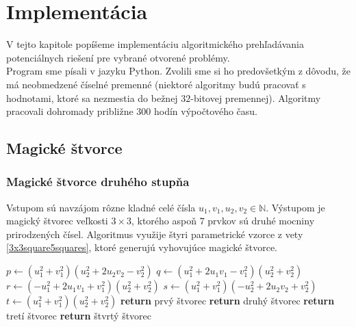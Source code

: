 \chapter{Implementácia}

\label{kap:implementation} %

V tejto kapitole popíšeme implementáciu algoritmického prehľadávania potenciálnych riešení pre vybrané otvorené problémy. \\

Program sme písali v jazyku Python. Zvolili sme si ho predovšetkým z dôvodu, že má neobmedzené číselné premenné (niektoré algoritmy budú pracovať s hodnotami, ktoré sa nezmestia do bežnej $32$-bitovej premennej). Algoritmy pracovali dohromady približne $300$ hodín výpočtového času.

\section{Magické štvorce}

\subsection{Magické štvorce druhého stupňa}

\begin{subalg} Vstupom sú navzájom rôzne kladné celé čísla $u_1, v_1, u_2, v_2 \in \mathbb{N}$. Výstupom je magický štvorec veľkosti $3 \times 3$, ktorého aspoň $7$ prvkov sú druhé mocniny prirodzených čísel. Algoritmus využije štyri parametrické vzorce z vety \ref{3x3square5squares}, ktoré generujú vyhovujúce magické štvorce.
\end{subalg}

\begin{algorithmic}
\State $p \gets (u_1^2 + v_1^2)(u_2^2 + 2u_2 v_2 - v_2^2)$
\State $q \gets (u_1^2 + 2u_1 v_1 - v_1^2)(u_2^2 + v_2^2)$
\State $r \gets (- u_1^2 + 2u_1 v_1 + v_1^2)(u_2^2 + v_2^2)$
\State $s \gets (u_1^2 + v_1^2)(-u_2^2 + 2u_2 v_2 + v_2^2)$
\State $t \gets (u_1^2 + v_1^2)(u_2^2 + v_2^2)$
    \STATE \textbf{return} prvý štvorec
\ENDIF
{}
    \STATE \textbf{return} druhý štvorec
\ENDIF
{}
    \STATE \textbf{return} tretí štvorec
\ENDIF
{}
    \STATE \textbf{return} štvrtý štvorec
\ENDIF
\end{algorithmic}


